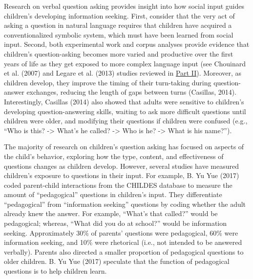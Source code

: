 \documentclass[english,floatsintext,man]{apa6}
\theoremstyle{definition}
\theoremstyle{definition}
\theoremstyle{definition}
\theoremstyle{remark}
\begin{document}
Research on verbal question asking provides insight into how social
input guides children's developing information seeking. First, consider
that the very act of asking a question in natural language requires that
children have acquired a conventionalized symbolic system, which must
have been learned from social input. Second, both experimental work and
corpus analyses provide evidence that children's question-asking becomes
more varied and productive over the first years of life as they get
exposed to more complex language input (see Chouinard et al. (2007) and
Legare et al. (2013) studies reviewed in \protect\hyperlink{p2}{Part
II}). Moreover, as children develop, they improve the timing of their
turn-taking during question-answer exchanges, reducing the length of
gaps between turns (Casillas, 2014). Interestingly, Casillas (2014) also
showed that adults were sensitive to children's developing
question-answering skills, waiting to ask more difficult questions until
children were older, and modifying their questions if children were
confused (e.g., \enquote{Who is this? -\textgreater{} What's he called?
-\textgreater{} Who is he? -\textgreater{} What is his name?}).

The majority of research on children's question asking has focused on
aspects of the child's behavior, exploring how the type, content, and
effectiveness of questions changes as children develop. However, several
studies have measured children's exposure to questions in their input.
For example, B. Yu Yue (2017) coded parent-child interactions from the
CHILDES database to measure the amount of \enquote{pedagogical}
questions in children's input. They differentiate \enquote{pedagogical}
from \enquote{information seeking} questions by coding whether the adult
already knew the answer. For example, \enquote{What's that called?}
would be pedagogical; whereas, \enquote{What did you do at school?}
would be information seeking. Approximately 30\% of parents' questions
were pedagogical, 60\% were information seeking, and 10\% were
rhetorical (i.e., not intended to be answered verbally). Parents also
directed a smaller proportion of pedagogical questions to older
children. B. Yu Yue (2017) speculate that the function of pedagogical
questions is to help children learn.
\end{document}
